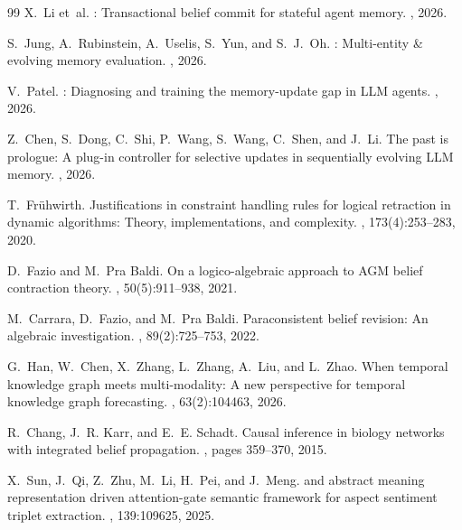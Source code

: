 \documentclass{article}
\theoremstyle{definition}
\begin{document}
{\begin{thebibliography}{99}
X.~Li et~al.
: Transactional belief commit for stateful agent memory.
, 2026.

S.~Jung, A.~Rubinstein, A.~Uselis, S.~Yun, and S.~J.~Oh.
: Multi-entity \& evolving memory evaluation.
, 2026.

V.~Patel.
: Diagnosing and training the memory-update gap in
  {LLM} agents.
, 2026.

Z.~Chen, S.~Dong, C.~Shi, P.~Wang, S.~Wang, C.~Shen, and J.~Li.
\newblock The past is prologue: A plug-in controller for selective
  updates in sequentially evolving {LLM} memory.
, 2026.

T.~Fr\"uhwirth.
\newblock Justifications in constraint handling rules for logical
  retraction in dynamic algorithms: Theory, implementations, and
  complexity.
, 173(4):253--283, 2020.

D.~Fazio and M.~Pra Baldi.
\newblock On a logico-algebraic approach to {AGM} belief contraction
  theory.
, 50(5):911--938, 2021.

M.~Carrara, D.~Fazio, and M.~Pra Baldi.
\newblock Paraconsistent belief revision: An algebraic investigation.
, 89(2):725--753, 2022.

G.~Han, W.~Chen, X.~Zhang, L.~Zhang, A.~Liu, and L.~Zhao.
\newblock When temporal knowledge graph meets multi-modality: A new
  perspective for temporal knowledge graph forecasting.
,
  63(2):104463, 2026.

R.~Chang, J.~R. Karr, and E.~E. Schadt.
\newblock Causal inference in biology networks with integrated belief
  propagation.
, pages 359--370, 2015.

X.~Sun, J.~Qi, Z.~Zhu, M.~Li, H.~Pei, and J.~Meng.
 and abstract meaning representation driven
  attention-gate semantic framework for aspect sentiment triplet
  extraction.
,
  139:109625, 2025.

\end{thebibliography}
}
\end{document}
